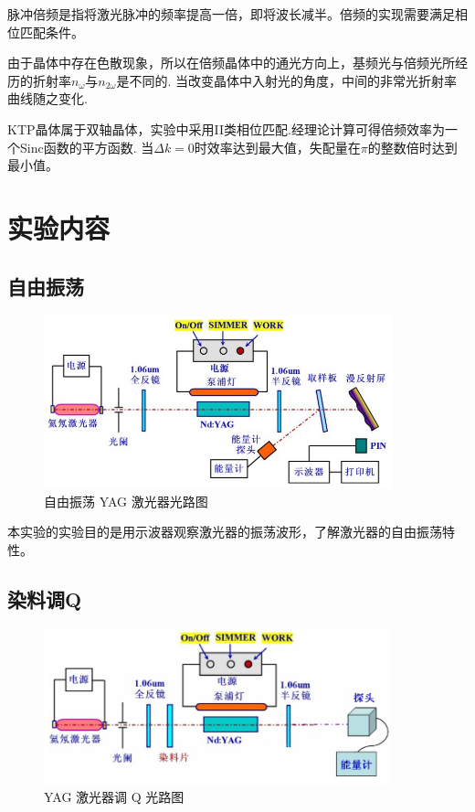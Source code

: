 \documentclass[a4paper,UTF8]{ctexart}
\begin{document}
脉冲倍频是指将激光脉冲的频率提高一倍，即将波长减半。倍频的实现需要满足相位匹配条件。

由于晶体中存在色散现象，所以在倍频晶体中的通光方向上，基频光与倍频光所经历的折射率$n_{\omega}$与$n_{2\omega}$是不同的.
当改变晶体中入射光的角度，中间的非常光折射率曲线随之变化.

KTP晶体属于双轴晶体，实验中采用II类相位匹配.经理论计算可得倍频效率为一个Sinc函数的平方函数.
当$\Delta k=0$时效率达到最大值，失配量在$\pi$的整数倍时达到最小值。
\section{实验内容}

\subsection{自由振荡}

\begin{figure}[H]
    \centering
    \begin{minipage}[b]{0.9\textwidth}
        \centering
        \includegraphics[width=0.9\textwidth]{./fig1.jpg}
        \caption{自由振荡 YAG 激光器光路图}
    \end{minipage}
\end{figure}

本实验的实验目的是用示波器观察激光器的振荡波形，了解激光器的自由振荡特性。

\subsection{染料调Q}

\begin{figure}[H]
    \centering
    \begin{minipage}[b]{0.9\textwidth}
        \centering
        \includegraphics[width=0.9\textwidth]{./fig5.jpg}
        \caption{YAG 激光器调 Q 光路图}
    \end{minipage}
\end{figure}
\end{document}
